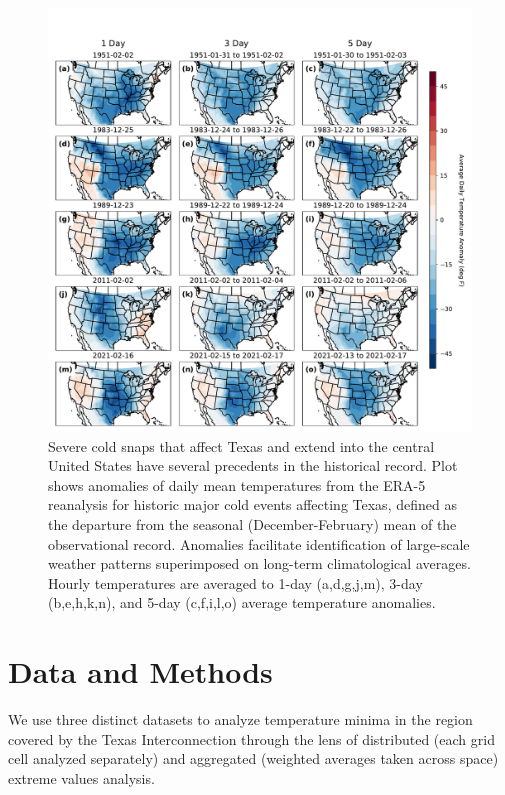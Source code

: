 \documentclass[12pt]{iopart}
\begin{document}
\begin{figure}
  \centering
  \includegraphics[width=\textwidth]{historic_events_era5.pdf}
  \caption{
    Severe cold snaps that affect Texas and extend into the central United States have several precedents in the historical record.
    Plot shows anomalies of daily mean temperatures from the ERA-5 reanalysis \cite{hersbach_era5:2020} for historic major cold events affecting Texas, defined as the departure from the seasonal (December-February) mean of the observational record.
    Anomalies facilitate identification of large-scale weather patterns superimposed on long-term climatological averages.
    Hourly temperatures are averaged to 1-day (a,d,g,j,m), 3-day (b,e,h,k,n), and 5-day (c,f,i,l,o) average temperature anomalies.
  }\label{fig:historic_era5}
\end{figure}

\section{Data and Methods}

We use three distinct datasets to analyze temperature minima in the region covered by the Texas Interconnection through the lens of distributed (each grid cell analyzed separately) and aggregated (weighted averages taken across space) extreme values analysis.
\end{document}
